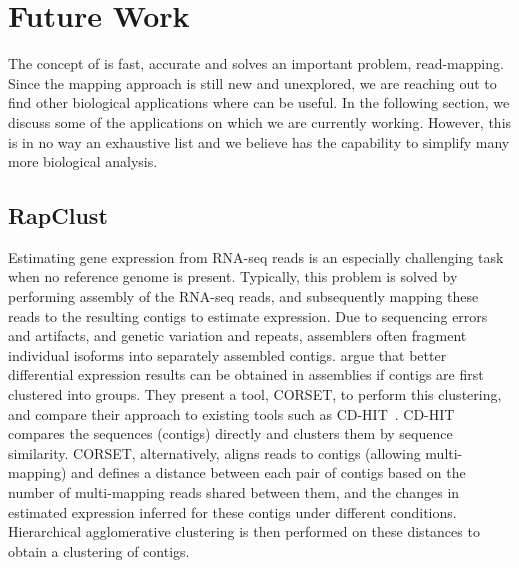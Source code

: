 \section{Future Work}

The concept of \qm is fast, accurate and solves an important problem, read-mapping. Since the mapping approach is still new and unexplored, we are reaching out to find other biological applications where \rapmap can be useful. In the following section, we discuss some of the applications on which we are currently working. However, this is in no way an exhaustive list and we believe \rapmap has the capability to simplify many more biological analysis.

\subsection{RapClust~\citep{srivastava2016accurate}}

Estimating gene expression from RNA-seq reads is an especially challenging task when no reference genome is present. Typically, this problem is solved by performing \denovo assembly of the RNA-seq reads, and subsequently mapping these reads to the resulting contigs to estimate expression. Due to sequencing errors and artifacts, and genetic variation and repeats, \denovo assemblers often fragment individual isoforms into separately assembled contigs.  \citet{corset} argue that better differential expression results can be obtained in \denovo assemblies if contigs are first clustered into groups.  They present a tool, CORSET, to perform this clustering, and compare their approach to existing tools such as CD-HIT~\citep{fu2012cd}. CD-HIT compares the sequences (contigs) directly and clusters them by sequence similarity. CORSET, alternatively, aligns reads to contigs (allowing multi-mapping) and defines a distance between each pair of contigs based on the number of multi-mapping reads shared between them, and the changes in estimated expression inferred for these contigs under different conditions. Hierarchical agglomerative clustering is then performed on these distances to obtain a clustering of contigs.

